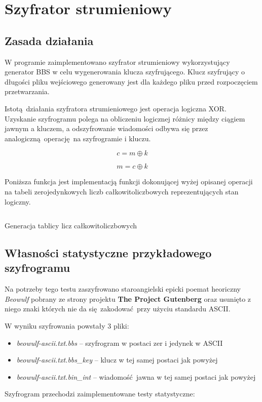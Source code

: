 \documentclass[12pt]{article}
\begin{document}
\newpage

\section{Szyfrator strumieniowy}

\subsection{Zasada działania}

W programie zaimplementowano szyfrator strumieniowy wykorzystujący generator BBS
w celu wygenerowania klucza szyfrującego.
Klucz szyfrujący o długości pliku wejściowego 
generowany jest dla każdego pliku przed rozpoczęciem przetwarzania.

Istotą działania szyfratora strumieniowego jest operacja logiczna XOR.
Uzyskanie szyfrogramu polega na obliczeniu logicznej różnicy między ciągiem jawnym a kluczem,
a odszyfrowanie wiadomości odbywa się przez analogiczną operację na szyfrogramie i kluczu.

\begin{equation}
	c = m \oplus k 
\end{equation}

\begin{equation}
	m = c \oplus k
\end{equation}

Poniższa funkcja jest implementacją funkcji dokonującej wyżej opisanej operacji
na tabeli zerojedynkowych liczb całkowitoliczbowych reprezentujących stan logiczny.

\begin{listing}[H]
	\inputminted[firstline=49,lastline=50]{python}{../bbs_generator.py}
	\caption{Generacja tablicy licz całkowitoliczbowych}
\end{listing}

\subsection{Własności statystyczne przykładowego szyfrogramu}

Na potrzeby tego testu zaszyfrowano staroangielski epicki poemat heoriczny \textit{Beowulf}
pobrany ze strony projektu \textbf{The Project Gutenberg} oraz usunięto z niego znaki
których nie da się zakodować przy użyciu standardu ASCII.

W wyniku szyfrowania powstały 3 pliki:
\begin{itemize}
	\item \textit{beowulf-ascii.txt.bbs} -- szyfrogram w postaci zer i jedynek w ASCII
	\item \textit{beowulf-ascii.txt.bbs\_key} -- klucz w tej samej postaci jak powyżej 
	\item \textit{beowulf-ascii.txt.bin\_int} -- wiadomość jawna w tej samej postaci jak powyżej
\end{itemize}

Szyfrogram przechodzi zaimplementowane testy statystyczne:
\inputminted{text}{1-test-cipher.txt}
\end{document}
